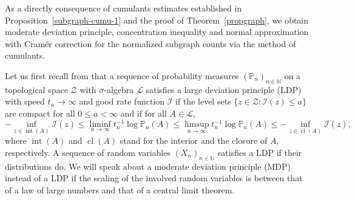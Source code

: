 \documentclass{article}
\theoremstyle{definition}
\numberwithin{equation}{section}
\theoremstyle{remark}
\begin{document}
As a directly consequence of cumulants estimates established in Proposition~\ref{subgraph-cumu-1} and the proof of Theorem~\ref{propgraph}, we obtain moderate deviation principle, concentration inequality and normal approximation with Cram\'er correction for the normalized subgraph counts via the method of cumulants. 

Let us first recall from \cite{DemboZeitouni2010} that a sequence of probability measures $(\mathbb{P}_n)_{n\in\mathbb{N}}$ on a topological space $\mathcal{Z}$ with $\sigma$-algebra $\mathscr{L}$ satisfies a large deviation principle (LDP) with speed $t_n\to\infty$ and good rate function $\mathcal{I}$ if the level sets $\{z\in\mathcal{Z}:\mathcal{I}(z)\le a\}$ are compact for all $0\le a<\infty$ and if for all $A\in\mathscr{L}$,
\begin{equation*}
	-\inf_{z\in\operatorname{int}(A)}\mathcal{I}(z)\le\liminf_{n\to\infty}t_n^{-1}\log\mathbb{P}_n(A)\le\limsup_{n\to\infty}t_n^{-1}\log\mathbb{P}_n(A)\le-\inf_{z\in\operatorname{cl}(A)}\mathcal{I}(z),
\end{equation*}
where $\operatorname{int}(A)$ and $\operatorname{cl}(A)$ stand for the interior and the closure of $A$, respectively. 
A sequence of random variables $(X_n)_{n\in\mathbb{N}}$ satisfies a LDP if their distributions do. We will speak about a moderate deviation principle (MDP) instead of a LDP if the scaling of the involved random variables is between that of a law of large numbers and that of a central limit theorem.
\end{document}
